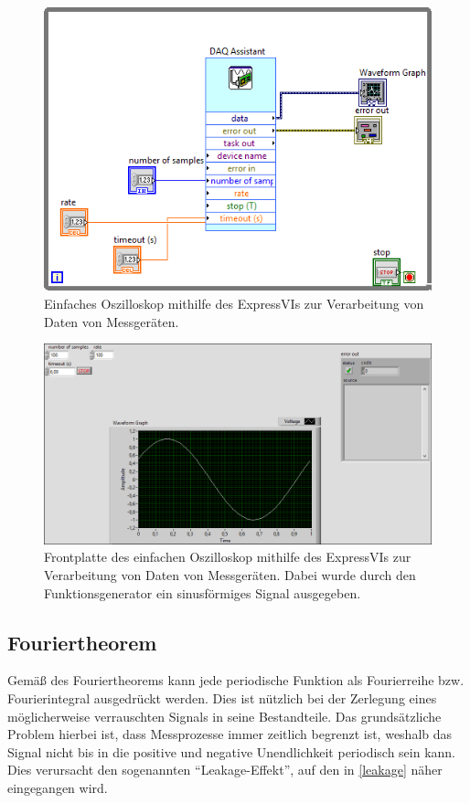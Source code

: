 \documentclass[
a4paper,
12pt,
pagesize,
ngerman
]{scrartcl}
\begin{document}
	\begin{figure}[H]  
		\includegraphics[width=1\textwidth]{EIRE2018Dateien/Tag2/expressVI_1d}
		\centering
		\caption{
			Einfaches Oszilloskop mithilfe des ExpressVIs zur Verarbeitung von Daten von Messgeräten.
		}
		\label{fig_tag2_oszi_express_block}
		\centering
	\end{figure}
	\begin{figure}[H]  
		\includegraphics[width=1\textwidth]{EIRE2018Dateien/Tag2/expressVI_1p}
		\centering
		\caption{
			Frontplatte des einfachen Oszilloskop mithilfe des ExpressVIs zur Verarbeitung von Daten von Messgeräten. Dabei wurde durch den Funktionsgenerator ein sinusförmiges Signal ausgegeben.
		}
		\label{fig_tag2_oszi_express_front}
	\centering
	\end{figure}
	
	\subsection{Fouriertheorem} %
	Gemäß des Fouriertheorems kann jede periodische Funktion als Fourierreihe bzw. Fourierintegral ausgedrückt werden.
	Dies ist nützlich bei der Zerlegung eines möglicherweise verrauschten Signals in seine Bestandteile.
	Das grundsätzliche Problem hierbei ist, dass Messprozesse immer zeitlich begrenzt ist, weshalb das Signal nicht bis in die positive und negative Unendlichkeit periodisch sein kann.
	Dies verursacht den sogenannten \enquote{Leakage-Effekt}, auf den in \cref{leakage} näher eingegangen wird.
	
\end{document}
